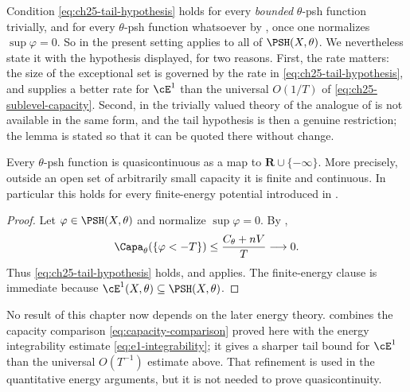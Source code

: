 \begin{remark}
\label{rem:ch25-tail-not-automatic}
Condition \eqref{eq:ch25-tail-hypothesis} holds for every \emph{bounded}
$\theta$-psh function trivially, and for every $\theta$-psh function
whatsoever by , once one normalizes
$\sup\varphi=0$.  So in the present setting
 applies to all of
$\PSH(X,\theta)$.  We nevertheless state it with the hypothesis displayed,
for two reasons.  First, the rate matters: the size of the exceptional set
is governed by the rate in \eqref{eq:ch25-tail-hypothesis}, and
 supplies a better rate for $\cE^1$ than the
universal $O(1/T)$ of \eqref{eq:ch25-sublevel-capacity}.  Second, in the
trivially valued theory of  the analogue of
 is not available in the same form, and
the tail hypothesis is then a genuine restriction; the lemma is stated so
that it can be quoted there without change.
\end{remark}

\begin{theorem}
\label{thm:ch25-psh-quasicontinuity}
\label{thm:e1-quasicontinuity}
Every $\theta$-psh function is quasicontinuous as a map to
$\mathbf R\cup\{-\infty\}$.  More precisely, outside an open set of
arbitrarily small capacity it is finite and continuous.  In particular this
holds for every finite-energy potential introduced in
.
\end{theorem}

\begin{proof}
Let $\varphi\in\PSH(X,\theta)$ and normalize $\sup\varphi=0$.  By
,
\[
 \Capa_\theta(\{\varphi<-T\})
 \leq\frac{C_\theta+nV}{T}\longrightarrow0.
\]
Thus \eqref{eq:ch25-tail-hypothesis} holds, and
 applies.  The finite-energy clause
is immediate because $\cE^1(X,\theta)\subseteq\PSH(X,\theta)$.
\end{proof}

\begin{remark}
\label{rem:ch25-no-circularity}
No result of this chapter now depends on the later energy theory.
 combines the capacity comparison
\eqref{eq:capacity-comparison} proved here with the energy integrability
estimate \eqref{eq:e1-integrability}; it gives a sharper tail bound for
$\cE^1$ than the universal $O(T^{-1})$ estimate above.  That refinement is
used in the quantitative energy arguments, but it is not needed to prove
quasicontinuity.
\end{remark}

